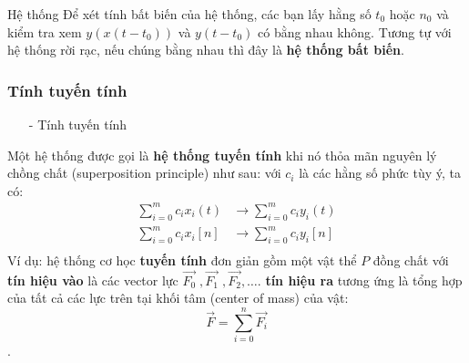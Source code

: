 \documentclass[8pt]{beamer}
\begin{document}
\begin{frame}{Hệ thống}
	Để xét tính bất biến của hệ thống, các bạn lấy hằng số $t_{0}$ hoặc $n_{0}$ và kiểm tra xem $y(x(t-t_{0}))$ và $y(t-t_{0})$ có bằng nhau không. Tương tự với hệ thống rời rạc, nếu chúng bằng nhau thì đây là \textbf{hệ thống bất biến}.
\subsubsection{Tính tuyến tính}
\begin{itemize}
	\item [-]Tính tuyến tính
\end{itemize}
Một hệ thống được gọi là \textbf{hệ thống tuyến tính} khi nó thỏa mãn \alert{nguyên lý chồng chất} (superposition principle) như sau: với $c_{i}$ là các hằng số phức tùy ý, ta có:
\begin{equation*}
	\begin{split}
		\sum_{i=0}^{m}c_{i}x_{i}(t)&\to \sum_{i=0}^{m}c_{i}y_{i}(t)\\
		\sum_{i=0}^{m}c_{i}x_{i}[n]&\to \sum_{i=0}^{m}c_{i}y_{i}[n]\\
	\end{split}
\end{equation*}
Ví dụ: hệ thống cơ học \textbf{tuyến tính} đơn giản gồm một vật thể $P$ đồng chất với \textbf{tín hiệu vào} là các vector lực $\overrightarrow{F_{0}}\; ,\overrightarrow{F_{1}}\;,\overrightarrow{F_{2}},\dots$. \textbf{tín hiệu ra} tương ứng là tổng hợp của tất cả các lực trên tại khối tâm (center of mass) của vật: $$\overrightarrow{F}=\sum_{i=0}^{n}\overrightarrow{F_{i}}$$.
\end{frame}
\end{document}
